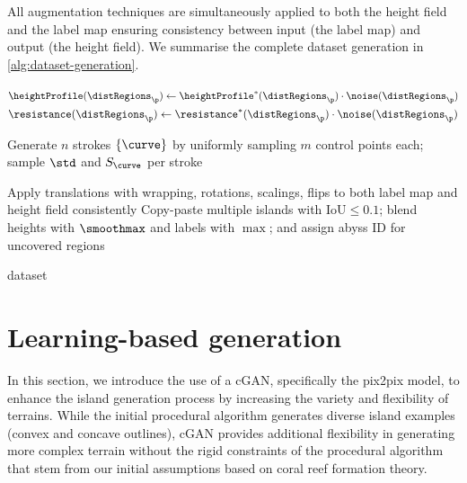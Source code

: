 All augmentation techniques are simultaneously applied to both the height field and the label map ensuring consistency between input (the label map) and output (the height field). We summarise the complete dataset generation in \cref{alg:dataset-generation}.


\begin{algorithm}[H]
    \caption{Procedural dataset generation.}
    \label{alg:dataset-generation}
    \DontPrintSemicolon

    \BlankLine
    $\heightProfile(\distRegions_\p) \gets \heightProfile^*(\distRegions_\p)\cdot \noise(\distRegions_\p)$\;
    $\resistance(\distRegions_\p) \gets \resistance^*(\distRegions_\p)\cdot \noise(\distRegions_\p)$\;

    Generate $n$ strokes $\{\curve\}$ by uniformly sampling $m$ control points each; sample $\std$ and $S_\curve$ per stroke\;


    Apply translations with wrapping, rotations, scalings, flips to both label map and height field consistently\;
    Copy-paste multiple islands with IoU$\le 0.1$; blend heights with $\smoothmax$ and labels with $\max$; and assign abyss ID for uncovered regions\;

    \Return dataset
\end{algorithm}

\section{Learning-based generation}
\label{sec:coral-island-cGAN-training}

In this section, we introduce the use of a cGAN, specifically the pix2pix model, to enhance the island generation process by increasing the variety and flexibility of terrains. While the initial procedural algorithm generates diverse island examples (convex and concave outlines), cGAN provides additional flexibility in generating more complex terrain without the rigid constraints of the procedural algorithm that stem from our initial assumptions based on coral reef formation theory.

